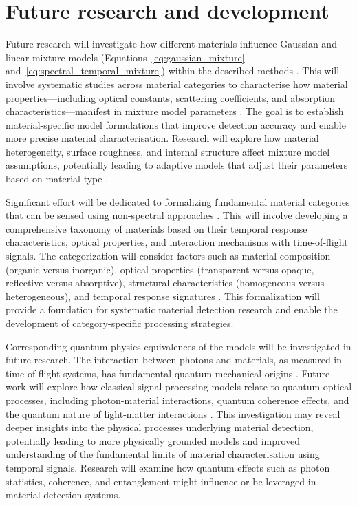 \documentclass[12pt,a4paper,oneside]{report}
\let\oldsection\section
\renewcommand{\section}{\clearpage\oldsection}
\begin{document}
\section{Future research and development}
\label{sec:future_research_directions}

Future research will investigate how different materials influence Gaussian and linear mixture models (Equations~\ref{eq:gaussian_mixture} and~\ref{eq:spectral_temporal_mixture}) within the described methods \cite{tontini2020,koerner2021}. This will involve systematic studies across material categories to characterise how material properties—including optical constants, scattering coefficients, and absorption characteristics—manifest in mixture model parameters \cite{su2016,becker2023}. The goal is to establish material-specific model formulations that improve detection accuracy and enable more precise material characterisation. Research will explore how material heterogeneity, surface roughness, and internal structure affect mixture model assumptions, potentially leading to adaptive models that adjust their parameters based on material type \cite{koerner2021}.

Significant effort will be dedicated to formalizing fundamental material categories that can be sensed using non-spectral approaches \cite{su2016,becker2023,tafone2023}. This will involve developing a comprehensive taxonomy of materials based on their temporal response characteristics, optical properties, and interaction mechanisms with time-of-flight signals. The categorization will consider factors such as material composition (organic versus inorganic), optical properties (transparent versus opaque, reflective versus absorptive), structural characteristics (homogeneous versus heterogeneous), and temporal response signatures \cite{elachi2021}. This formalization will provide a foundation for systematic material detection research and enable the development of category-specific processing strategies.

Corresponding quantum physics equivalences of the models will be investigated in future research. The interaction between photons and materials, as measured in time-of-flight systems, has fundamental quantum mechanical origins \cite{elachi2021,griffiths2017}. Future work will explore how classical signal processing models relate to quantum optical processes, including photon-material interactions, quantum coherence effects, and the quantum nature of light-matter interactions \cite{elachi2021}. This investigation may reveal deeper insights into the physical processes underlying material detection, potentially leading to more physically grounded models and improved understanding of the fundamental limits of material characterisation using temporal signals. Research will examine how quantum effects such as photon statistics, coherence, and entanglement might influence or be leveraged in material detection systems.
\end{document}
